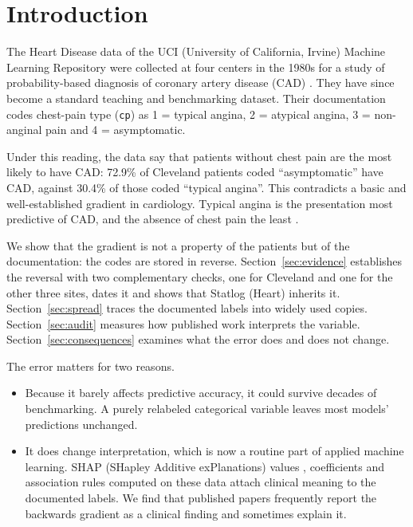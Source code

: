 \documentclass[11pt]{article}
\begin{document}
\section{Introduction}

The Heart Disease data of the UCI (University of California, Irvine) Machine Learning Repository \cite{uciheart} were collected at four centers in the 1980s for a study of probability-based diagnosis of coronary artery disease (CAD) \cite{detrano1989}. They have since become a standard teaching and benchmarking dataset. Their documentation codes chest-pain type (\texttt{cp}) as 1 = typical angina, 2 = atypical angina, 3 = non-anginal pain and 4 = asymptomatic.

Under this reading, the data say that patients without chest pain are the most likely to have CAD: 72.9\% of Cleveland patients coded ``asymptomatic'' have CAD, against 30.4\% of those coded ``typical angina''. %
This contradicts a basic and well-established gradient in cardiology. Typical angina is the presentation most predictive of CAD, and the absence of chest pain the least \cite{diamond1979}.

We show that the gradient is not a property of the patients but of the documentation: the codes are stored in reverse. Section~\ref{sec:evidence} establishes the reversal with two complementary checks, one for Cleveland and one for the other three sites, dates it and shows that Statlog (Heart) inherits it. Section~\ref{sec:spread} traces the documented labels into widely used copies. Section~\ref{sec:audit} measures how published work interprets the variable. Section~\ref{sec:consequences} examines what the error does and does not change.

The error matters for two reasons.
\begin{itemize}
\item Because it barely affects predictive accuracy, it could survive decades of benchmarking. A purely relabeled categorical variable leaves most models' predictions unchanged.
\item It does change interpretation, which is now a routine part of applied machine learning. SHAP (SHapley Additive exPlanations) values \cite{lundberg2017}, coefficients and association rules computed on these data attach clinical meaning to the documented labels. We find that published papers frequently report the backwards gradient as a clinical finding and sometimes explain it.
\end{itemize}
\end{document}
